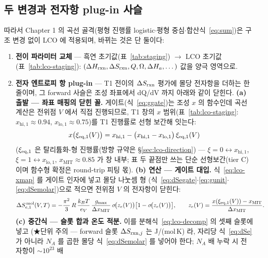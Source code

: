 \subsection{두 변경과 전자항 plug-in 사슬}\label{sec:lco-code-plugin}
따라서 Chapter 1 의 곡선 골격(평형 진행률 logistic$\cdot$평형 중심$\cdot$합산식~\eqref{eq:sum})은 구조 변경 없이
LCO 에 적용되며, 바뀌는 것은 단 둘이다:
\begin{enumerate}[label=(\roman*),leftmargin=2.2em,itemsep=1pt]
\item \textbf{전이 파라미터 교체} --- 흑연 초기값(표~\ref{tab:staging}) $\to$ LCO 초기값(표~\ref{tab:lco-staging}):
$(\Delta H_{\mathrm{rxn}},\Delta S_{\mathrm{rxn}},Q,\Omega,\Delta H_a,\dots)$ 값을 양극 영역으로.
\item \textbf{전자 엔트로피 항 plug-in} --- T1 전이의 $\Delta S_{\mathrm{rxn}}$ 평가에 몰당 전자항을 더하는 한 줄이며,
그 forward 사슬은 조성 좌표에서 dQ/dV 까지 아래와 같이 닫힌다.
\textbf{(a) 출발 --- 좌표 매핑의 닫힌 꼴.} 게이트(식~\eqref{eq:ggate})는 조성 $x$ 의 함수인데 곡선 계산은
전위점 $V$ 에서 직접 진행되므로, T1 창의 $x$ 범위(표~\ref{tab:lco-staging}: $x_{\mathrm{hi},1}{\approx}0.94$,
$x_{\mathrm{lo},1}{\approx}0.75$)를 T1 진행률로 선형 보간해 잇는다:
\begin{equation}
x\big(\xi_{\mathrm{eq},1}(V)\big)=x_{\mathrm{hi},1}-\big(x_{\mathrm{hi},1}-x_{\mathrm{lo},1}\big)\,\xi_{\mathrm{eq},1}(V)
\label{eq:lco-xmap}
\end{equation}
($\xi_{\mathrm{eq},1}$ 은 탈리튬화-형 진행률(방향 규약은 \S\ref{sec:lco-direction}) --- $\xi{=}0\leftrightarrow x_{\mathrm{hi},1}$, $\xi{=}1\leftrightarrow x_{\mathrm{lo},1}$, $x_\mathrm{MIT}{\approx}0.85$ 가 창 내부; 표 두 끝점만 쓰는 단순 선형보간(tier C)이며 함수형 확정은 round-trip 피팅 몫).
\textbf{(b) 연산 --- 게이트 대입.} 식~\eqref{eq:lco-xmap} 를 게이트 인자에 넣고 몰당 나눗셈 형
(식~\eqref{eq:dSegate}$\cdot$\eqref{eq:gunit}$\cdot$\eqref{eq:dSemolar})으로 적으면 전위점 $V$ 의
전자항이 닫힌다:
\begin{equation}
\Delta S_{e,1}^{\,\mathrm{mol}}(V,T)
=-\frac{\pi^2}{3}\,R\,\frac{k_BT}{e_V}\,\frac{g_{\max}}{\Delta x_\mathrm{MIT}}\,
\sigma\!\big(z_e(V)\big)\big[1-\sigma\!\big(z_e(V)\big)\big],
\qquad z_e(V)=\frac{x(\xi_{\mathrm{eq},1}(V))-x_\mathrm{MIT}}{\Delta x_\mathrm{MIT}}.
\label{eq:lco-SeV}
\end{equation}
\textbf{(c) 중간식 --- 슬롯 합과 온도 적분.} 이를 분해식~\eqref{eq:lco-decomp} 의 셋째 슬롯에 넣고
(★단위 주의 --- forward 슬롯 $\Delta S_{\mathrm{rxn},j}$ 는 J/(mol\,K) 라, 자리당 식~\eqref{eq:dSe} 가 아니라
$N_A$ 를 곱한 몰당 식~\eqref{eq:dSemolar} 를 넣어야 한다; $N_A$ 배 누락 시 전자항이 $\sim10^{23}$ 배

\end{enumerate}
